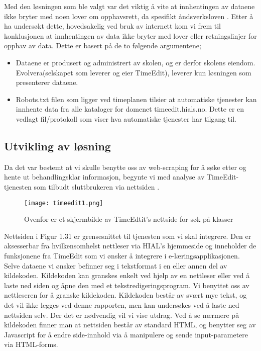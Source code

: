 \documentclass[../main.tex]{subfiles}
\begin{document}
Med den løsningen som ble valgt var det viktig å vite at innhentingen av dataene ikke bryter med noen lover om opphavsrett, da spesifikt åndsverksloven .
Etter å ha undersøkt dette, hovedsakelig ved bruk av internett kom vi frem til konklusjonen at innhentingen av data ikke bryter med lover eller retningslinjer for opphav av data. Dette er basert på de to følgende argumentene;

\begin{itemize}
\item Dataene er produsert og administrert av skolen, og er derfor skolens eiendom. Evolvera(selskapet som leverer og eier TimeEdit), leverer kun løsningen som presenterer dataene.
\item Robots.txt filen som ligger ved timeplanen tilsier at automatiske tjenester kan innhente data fra alle kataloger for domenet timeedit.hials.no. Dette er en vedlagt fil/protokoll som viser hva automatiske tjenester har tilgang til.
\end{itemize}



\subsection{Utvikling av løsning}

Da det var bestemt at vi skulle benytte oss av web-scraping for å søke etter og hente ut behandlingsklar informasjon, begynte vi med analyse av TimeEdit-tjenesten som tilbudt sluttbrukeren via nettsiden .

\begin{figure}[H]
  \centering
  \texttt{[image: timeedit1.png]}
\caption{Ovenfor  er et skjermbilde av TimeEdtit’s nettside for søk på klasser}
\label{fig:TimeEditMain}
\end{figure}
Nettsiden i Figur 1.31 er grensesnittet til tjenesten som vi skal integrere. Den er aksesserbar fra hvilkensomhelst nettleser via HIAL's hjemmeside  og inneholder de funksjonene fra TimeEdit som vi ønsker å integrere i e-læringsapplikasjonen. Selve dataene vi ønsker befinner seg i tekstformat i en eller annen del av kildekoden. Kildekoden kan granskes enkelt ved hjelp av en nettleser eller ved å laste ned siden og åpne den med et tekstredigeringsprogram. Vi benyttet oss av nettleseren for å granske kildekoden. Kildekoden består av svært mye tekst, og det vil ikke legges ved denne rapporten, men kan undersøkes ved å laste ned nettsiden selv. Der det er nødvendig vil vi vise utdrag.\newline
\newline
Ved å se nærmere på kildekoden finner man at nettsiden består av standard HTML, og benytter seg av Javascript for å endre side-innhold via å manipulere og sende input-parametere via HTML-forms. 
\end{document}
